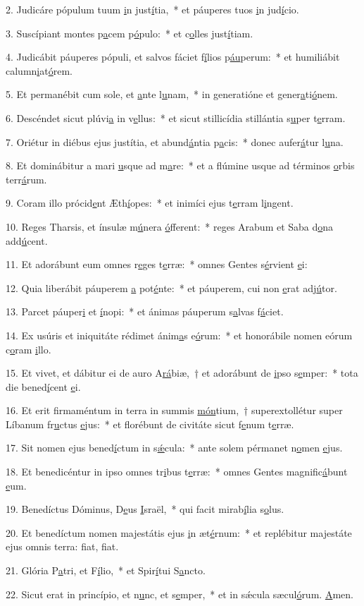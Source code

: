 2. Judicáre pópulum tuum \uline{i}n just\uline{í}tia,~* et páuperes tuos \uline{i}n jud\uline{í}cio.\par 
3. Suscípiant montes p\uline{a}cem p\uline{ó}pulo:~* et c\uline{o}lles just\uline{í}tiam.\par 
4. Judicábit páuperes pópuli, et salvos fáciet f\uline{í}lios p\uline{áu}perum:~* et humiliábit calumn\uline{i}at\uline{ó}rem.\par 
5. Et permanébit cum sole, et \uline{a}nte l\uline{u}nam,~* in generatióne et gener\uline{a}ti\uline{ó}nem.\par 
6. Descéndet sicut plúvi\uline{a} in v\uline{e}llus:~* et sicut stillicídia stillántia s\uline{u}per t\uline{e}rram.\par 
7. Oriétur in diébus ejus justítia, et abund\uline{á}ntia p\uline{a}cis:~* donec aufer\uline{á}tur l\uline{u}na.\par 
8. Et dominábitur a mari \uline{u}sque ad m\uline{a}re:~* et a flúmine usque ad términos \uline{o}rbis terr\uline{á}rum.\par 
9. Coram illo prócid\uline{e}nt Æth\uline{í}opes:~* et inimíci ejus t\uline{e}rram l\uline{i}ngent.\par 
10. Reges Tharsis, et ínsulæ m\uline{ú}nera \uline{ó}fferent:~* reges Arabum et Saba d\uline{o}na add\uline{ú}cent.\par 
11. Et adorábunt eum omnes r\uline{e}ges t\uline{e}rræ:~* omnes Gentes s\uline{é}rvient \uline{e}i:\par 
12. Quia liberábit páuperem \uline{a} pot\uline{é}nte:~* et páuperem, cui non \uline{e}rat adj\uline{ú}tor.\par 
13. Parcet páuper\uline{i} et \uline{í}nopi:~* et ánimas páuperum s\uline{a}lvas f\uline{á}ciet.\par 
14. Ex usúris et iniquitáte rédimet ánim\uline{a}s e\uline{ó}rum:~* et honorábile nomen eórum c\uline{o}ram \uline{i}llo.\par 
15. Et vivet, et dábitur ei de auro A\uline{rá}biæ,~† et adorábunt de \uline{i}pso s\uline{e}mper:~* tota die bened\uline{í}cent \uline{e}i.\par 
16. Et erit firmaméntum in terra in summis \uline{món}tium,~† superextollétur super Líbanum fr\uline{u}ctus \uline{e}jus:~* et florébunt de civitáte sicut f\uline{e}num t\uline{e}rræ.\par 
17. Sit nomen ejus bened\uline{í}ctum in s\uline{ǽ}cula:~* ante solem pérmanet n\uline{o}men \uline{e}jus.\par 
18. Et benedicéntur in ipso omnes tr\uline{i}bus t\uline{e}rræ:~* omnes Gentes magnific\uline{á}bunt \uline{e}um.\par 
19. Benedíctus Dóminus, D\uline{e}us \uline{I}sraël,~* qui facit mirab\uline{í}lia s\uline{o}lus.\par 
20. Et benedíctum nomen majestátis ejus \uline{i}n æt\uline{é}rnum:~* et replébitur majestáte ejus omnis terra: f\uline{i}at, f\uline{i}at.\par 
21. Glória P\uline{a}tri, et F\uline{í}lio,~* et Spir\uline{í}tui S\uline{a}ncto.\par 
22. Sicut erat in princípio, et n\uline{u}nc, et s\uline{e}mper,~* et in sǽcula sæcul\uline{ó}rum. \uline{A}men.\par 
